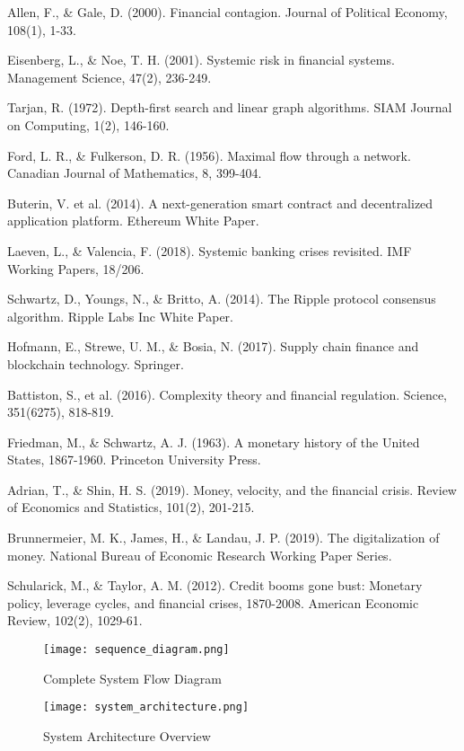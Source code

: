 \documentclass[twocolumn,10pt,a4paper]{article}
\begin{document}
\begin{thebibliography}{99}
 Allen, F., \& Gale, D. (2000). Financial contagion. Journal of Political Economy, 108(1), 1-33.

 Eisenberg, L., \& Noe, T. H. (2001). Systemic risk in financial systems. Management Science, 47(2), 236-249.

 Tarjan, R. (1972). Depth-first search and linear graph algorithms. SIAM Journal on Computing, 1(2), 146-160.

 Ford, L. R., \& Fulkerson, D. R. (1956). Maximal flow through a network. Canadian Journal of Mathematics, 8, 399-404.

 Buterin, V. et al. (2014). A next-generation smart contract and decentralized application platform. Ethereum White Paper.

 Laeven, L., \& Valencia, F. (2018). Systemic banking crises revisited. IMF Working Papers, 18/206.

 Schwartz, D., Youngs, N., \& Britto, A. (2014). The Ripple protocol consensus algorithm. Ripple Labs Inc White Paper.

 Hofmann, E., Strewe, U. M., \& Bosia, N. (2017). Supply chain finance and blockchain technology. Springer.

 Battiston, S., et al. (2016). Complexity theory and financial regulation. Science, 351(6275), 818-819.

 Friedman, M., \& Schwartz, A. J. (1963). A monetary history of the United States, 1867-1960. Princeton University Press.

 Adrian, T., \& Shin, H. S. (2019). Money, velocity, and the financial crisis. Review of Economics and Statistics, 101(2), 201-215.

 Brunnermeier, M. K., James, H., \& Landau, J. P. (2019). The digitalization of money. National Bureau of Economic Research Working Paper Series.

 Schularick, M., \& Taylor, A. M. (2012). Credit booms gone bust: Monetary policy, leverage cycles, and financial crises, 1870-2008. American Economic Review, 102(2), 1029-61.
\end{thebibliography}

\begin{figure}[p]
    \centering
    \texttt{[image: sequence\_diagram.png]}
    \caption{Complete System Flow Diagram}
\end{figure}

\clearpage

\begin{figure}[p]
\centering
\texttt{[image: system\_architecture.png]}
\caption{System Architecture Overview}
\end{figure}
\end{document}
